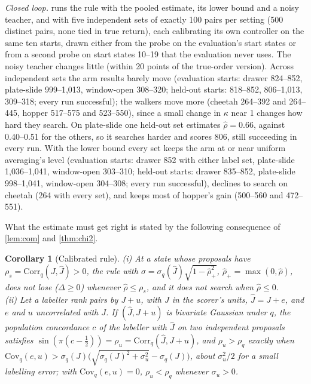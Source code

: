 \documentclass{article}
\theoremstyle{plain}
\newtheorem{corollary}[theorem]{Corollary}
\theoremstyle{remark}
\newcommand{\Jh}{\hat{J}}
\newcommand{\Cov}{\mathrm{Cov}}
\begin{document}


\emph{Closed loop.}  runs the rule with the pooled estimate, its lower bound and a noisy teacher, and
with five independent sets of exactly 100 pairs per setting (500 distinct pairs, none tied in true return), each
calibrating its own controller on the same ten starts, drawn either from the probe on the evaluation's start states or
from a second probe on start states 10--19 that the evaluation never uses. The noisy teacher changes little (within 20
points of the true-order version). Across independent sets the arm results barely move (evaluation starts: drawer
824--852, plate-slide 999--1,013, window-open 308--320; held-out starts: 818--852, 806--1,013, 309--318; every run
successful); the walkers move more (cheetah 264--392 and 264--445, hopper 517--575 and 523--550), since a small change
in $\kappa$ near 1 changes how hard they search. On plate-slide one held-out set estimates $\hat\rho=0.66$, against
0.40--0.51 for the others, so it searches harder and scores 806, still succeeding in every run. With the lower bound every set keeps the
arm at or near uniform averaging's level (evaluation starts: drawer 852 with either label set, plate-slide
1,036--1,041, window-open 303--310; held-out starts: drawer 835--852, plate-slide 998--1,041, window-open 304--308;
every run successful), declines to search on cheetah (264 with every set), and keeps most of hopper's gain (500--560
and 472--551).

What the estimate must get right is stated by the following consequence of \cref{lem:com} and \cref{thm:chi2}.

\begin{corollary}[Calibrated rule]\label{cor:calib}
(i) At a state whose proposals have $\rho_s=\mathrm{Corr}_q(J,\Jh)>0$, the rule with
$\sigma=\sigma_q(\Jh)\sqrt{1-\hat\rho_+^2}$, $\hat\rho_+=\max(0,\hat\rho)$, does not lose ($\Delta\ge0$) whenever
$\hat\rho\le\rho_s$, and it does not search when $\hat\rho\le0$.
\\[2pt](ii) Let a labeller rank pairs by $J+u$, with $J$ in the scorer's units, $\Jh=J+e$, and $e$ and $u$ uncorrelated
with $J$. If $(\Jh,J+u)$ is bivariate Gaussian under $q$, the population concordance $c$ of the labeller with $\Jh$ on
two independent proposals satisfies $\sin(\pi(c-\frac12))=\rho_u=\mathrm{Corr}_q(\Jh,J+u)$, and $\rho_u>\rho_q$
exactly when $\Cov_q(e,u)>\sigma_q(J)\big(\sqrt{\sigma_q(J)^2+\sigma_u^2}-\sigma_q(J)\big)$, about $\sigma_u^2/2$
for a small labelling error; with $\Cov_q(e,u)=0$, $\rho_u<\rho_q$ whenever $\sigma_u>0$.
\end{corollary}
\end{document}
